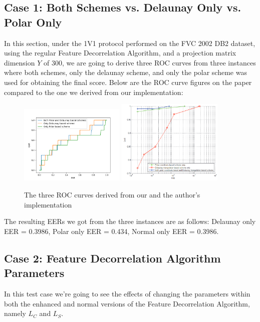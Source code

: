 \documentclass[fyp]{socreport}
\begin{document}
\subsection{Case 1: Both Schemes vs. Delaunay Only vs. Polar Only}
In this section, under the 1V1 protocol performed on the FVC 2002 DB2 dataset, using the regular Feature Decorrelation Algorithm, and a projection matrix dimension $Y$ of 300, we are going to derive  three ROC curves from three instances where both schemes, only the delaunay scheme, and only the polar scheme was used for obtaining the final score. Below are the ROC curve figures on the paper compared to the one we derived from our implementation:

\begin{figure}[H]
	\centering
	\includegraphics[width=0.45\textwidth]
	{3ROC}
	\includegraphics[width=0.45\textwidth]
	{3ROC2}
	\caption{The three ROC curves derived from our and the author's implementation}
\end{figure}

The resulting EERs we got from the three instances are as follows: Delaunay only EER = 0.3986, Polar only EER = 0.434, Normal only EER = 0.3986.

\subsection{Case 2: Feature Decorrelation Algorithm Parameters}
In this test case we're going to see the effects of changing the parameters within both the enhanced and normal versions of the Feature Decorrelation Algorithm, namely $L_C$ and $L_S$.
\end{document}
